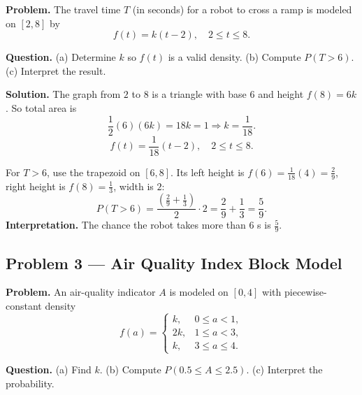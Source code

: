 \begin{ExamProblems}
		\textbf{Problem.}
		The travel time $T$ (in seconds) for a robot to cross a ramp is modeled on $[2,8]$ by
		\[
		f(t)=k(t-2),\quad 2\le t\le 8.
		\]
		
		\textbf{Question.}
		(a) Determine $k$ so $f(t)$ is a valid density.
		(b) Compute $P(T>6)$.
		(c) Interpret the result.
		
		\textbf{Solution.}
		The graph from $2$ to $8$ is a triangle with base $6$ and height $f(8)=6k$.
		So total area is
		\[
		\frac{1}{2}(6)(6k)=18k=1\Rightarrow k=\frac{1}{18}.
		\]
		\[
		f(t)=\frac{1}{18}(t-2),\quad 2\le t\le 8.
		\]
		\begin{center}
		\end{center}
		For $T>6$, use the trapezoid on $[6,8]$.
		Its left height is $f(6)=\frac{1}{18}(4)=\frac{2}{9}$, right height is $f(8)=\frac{1}{3}$, width is $2$:
		\[
		P(T>6)=\frac{\left(\frac{2}{9}+\frac{1}{3}\right)}{2}\cdot 2
		=\frac{2}{9}+\frac{1}{3}=\frac{5}{9}.
		\]
		\textbf{Interpretation.} The chance the robot takes more than 6 s is $\frac{5}{9}$.
		
		
		\item
		\subsection*{Problem 3 — Air Quality Index Block Model}
		
		\textbf{Problem.}
		An air-quality indicator $A$ is modeled on $[0,4]$ with piecewise-constant density
		\[
		f(a)=\begin{cases}
		k, & 0\le a<1,\\
		2k, & 1\le a<3,\\
		k, & 3\le a\le 4.
		\end{cases}
		\]
		
		\textbf{Question.}
		(a) Find $k$.
		(b) Compute $P(0.5\le A\le 2.5)$.
		(c) Interpret the probability.
		

\end{ExamProblems}
